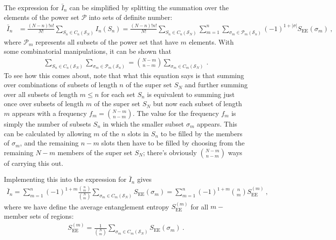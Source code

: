 The expression for \(\bar I_n\) can be simplified by splitting the summation over the elements of the power set \(\mathcal{P}\) into sets of definite number:
\begin{equation}\begin{aligned}
	\bar I_n &= \frac{(N-n)! n!}{N!}\sum_{S_n \in C_n(\mathcal{S}_N)} I_n(S_n) = \frac{(N-n)! n!}{N!}\sum_{S_n \in C_n(\mathcal{S}_N)}\sum_{m=1}^n \sum_{\sigma_m \in \mathcal{P}_m\left(\mathcal{S}_n\right)} (-1)^{1 + |\sigma|} S_\text{EE}(\sigma_m)~,
\end{aligned}\end{equation}
where \(\mathcal{P}_m\) represents all subsets of the power set that have \(m\) elements. With some combinatorial manipulations, it can be shown that
\begin{equation}\begin{aligned}
	\sum_{S_n \in C_n(\mathcal{S}_N)} \sum_{\sigma_m \in \mathcal{P}_m\left(\mathcal{S}_n\right)} = \binom{N-m}{n-m}\sum_{\sigma_m \in C_m(\mathcal{S}_N)}~.
\end{aligned}\end{equation}
To see how this comes about, note that what this equation says is that summing over combinations of subsets of length \(n\) of the super set \(S_N\) and further summing over all subsets of length \(m \leq n\) for each set \(S_n\) is equivalent to summing just once over subsets of length \(m\) of the super set \(S_N\) but now each subset of length \(m\) appears with a frequency \(f_m = \binom{N-m}{n-m}\). The value for the frequency \(f_m\) is simply the number of subsets \(S_n\) in which the smaller subset \(\sigma_m\) appears. This can be calculated by allowing \(m\) of the \(n\) slots in \(S_n\) to be filled by the members of \(\sigma_m\), and the remaining \(n-m\) slots then have to be filled by choosing from the remaining \(N-m\) members of the super set \(S_N\); there's obviously \(\binom{N-m}{n-m}\) ways of carrying this out.

Implementing this into the expression for \(\bar I_n\) gives
\begin{equation}\begin{aligned}
	\bar I_n = \sum_{m=1}^n (-1)^{1 + m} \frac{\binom{n}{m}}{\binom{N}{m}}\sum_{\sigma_m \in C_m(\mathcal{S}_N)} S_\text{EE}(\sigma_m) = \sum_{m=1}^n (-1)^{1 + m} \binom{n}{m}S_\text{EE}^{(m)}~,
\end{aligned}\end{equation}
where we have define the average entanglement entropy \(S_\text{EE}^{(m)}\) for all \(m-\)member sets of regions:
\begin{equation}\begin{aligned}
	S_\text{EE}^{(m)} = \frac{1}{\binom{N}{m}}\sum_{\sigma_m \in C_m(\mathcal{S}_N)} S_\text{EE}(\sigma_m)~.
\end{aligned}\end{equation}

